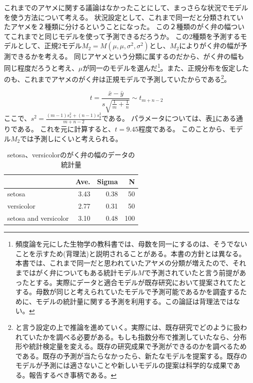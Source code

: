 これまでのアヤメに関する議論はなかったことにして、まっさらな状況でモデルを使う方法について考える。
状況設定として、これまで同一だと分類されていたアヤメを２種類に分けるということになった。
この２種類のがく弁の幅ついてこれまでと同じモデルを使って予測できるだろうか。
この$2$種類を予測するモデルとして、正規2モデル$M_2=M(\mu,\mu,\sigma^2,\sigma^2)$とし、$M_2$によりがく弁の幅が予測できるかを考える。
同じアヤメという分類に属するのだから、がく弁の幅も同じ程度だろうと考え、$\mu$が同一のモデルを選んだ\footnote{頻度論を元にした生物学の教科書では、母数を同一にするのは、そうでないことを示すため(背理法)と説明されることがある。本書の方針とは異なる。本書では、これまで同一だと思われていたアヤメの分類が増えたので、それまではがく弁についてもある統計モデル$M$で予測されていたと言う前提があったとする。実際にデータと適合モデルが既存研究において提案されてたとする。母数が同じと考えられていたモデルで予測可能であるかを調査するために、モデルの統計量に関する予測を利用する。この論証は背理法ではない。}。また、正規分布を仮定したのも、これまでアヤメのがく弁は正規モデルで予測していたからである\footnote{と言う設定の上で推論を進めていく。実際には、既存研究でどのように扱われていたかを調べる必要がある。もしも指数分布で推測していたなら、分布形や統計検定量を変える。既存の研究成果で予測ができるのかを調べるためである。既存の予測が当たらなかったら、新たなモデルを提案する。既存のモデルが予測には適さないことや新しいモデルの提案は科学的な成果である。報告するべき事柄である。}。

\begin{equation*}
    t = \frac{\bar{x}-\bar{y}}{s\sqrt{\frac{1}{m} + \frac{1}{n} }} \sim t_{m+n-2}
\end{equation*}
ここで、$s^2=\frac{(m-1)s_x^2+(n-1)s_y^2}{m+n-2}$である。
パラメータについては、表\ref{fig:seto_versi_speal_w_summary}にある通りである。
これを元に計算すると、$t=9.45$程度である。
このことから、モデル$M_2$では予測しにくいと考えられる。

\begin{table}
    \caption{setosa、versicolorのがく弁の幅のデータの統計量}
    \label{fig:seto_versi_speal_w_summary}
    \centering
    \begin{tabular}{lrrr}
        \hline
        {} &  Ave. &  Sigma &   N \\
        \hline \hline
        setosa     &  3.43 &   0.38 &  50 \\
        versicolor &  2.77 &   0.31 &  50 \\
        setosa and versicolor &  3.10 &   0.48 &  100 \\
        \hline
    \end{tabular}
\end{table}

